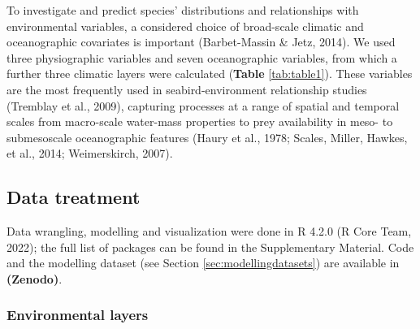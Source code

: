 \documentclass{article}
\begin{document}
\begin{linenumbers}
To investigate and predict species' distributions and relationships with environmental variables, a considered choice of broad-scale climatic and oceanographic covariates is important (Barbet-Massin \& Jetz, 2014). We used three physiographic variables and seven oceanographic variables, from which a further three climatic layers were calculated (\textbf{Table} \ref{tab:table1}). These variables are the most frequently used in seabird-environment relationship studies (Tremblay et al., 2009), capturing processes at a range of spatial and temporal scales from macro-scale water-mass properties to prey availability in meso- to submesoscale oceanographic features (Haury et al., 1978; Scales, Miller, Hawkes, et al., 2014; Weimerskirch, 2007).

\hypertarget{data-treatment}{%
\subsection{Data treatment}\label{data-treatment}}

Data wrangling, modelling and visualization were done in R 4.2.0 (R Core Team, 2022); the full list of packages can be found in the Supplementary Material. Code and the modelling dataset (see Section \ref{sec:modellingdatasets}) are available in \textbf{(Zenodo)}.

\hypertarget{environmental-layers}{%
\subsubsection{Environmental layers}\label{environmental-layers}}


\end{linenumbers}
\end{document}
